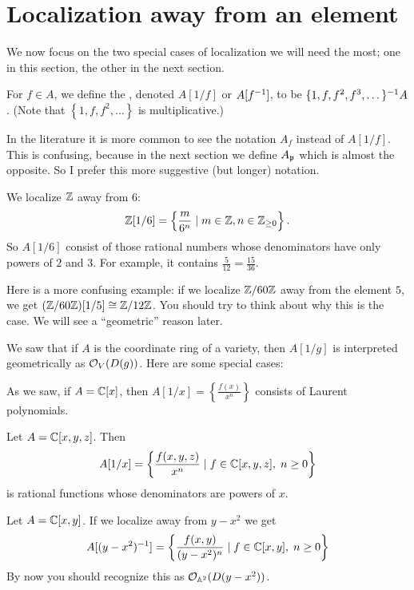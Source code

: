 \section{Localization away from an element}
We now focus on the two special cases of localization we will need the most;
one in this section, the other in the next section.
\begin{definition}
	For $f \in A$, we define the ,
	denoted $A[1/f]$ or $A[f^{-1}]$,
	to be $\{1, f, f^2, f^3, \dots\}^{-1} A$.
	(Note that $\left\{ 1, f, f^2, \dots \right\}$ is multiplicative.)
\end{definition}
\begin{remark}
	In the literature it is more common to
	see the notation $A_f$ instead of $A[1/f]$.
	This is confusing, because in the next section
	we define $A_\mathfrak p$ which is almost the opposite.
	So I prefer this more suggestive (but longer) notation.
\end{remark}

\begin{example}
	\listhack
	\begin{enumerate}[(a)]
		\ii We localize $\mathbb Z$ away from $6$:
		\[ \mathbb Z[1/6] = \left\{ \frac{m}{6^n} \mid m \in \mathbb Z,
			n \in \mathbb Z_{\ge 0} \right\}.  \]
		So $A[1/6]$ consist of those rational numbers whose
		denominators have only powers of $2$ and $3$.
		For example, it contains $\frac{5}{12} = \frac{15}{36}$.

		\ii Here is a more confusing example:
		if we localize $\mathbb Z/60\mathbb Z$ away from the element $5$,
		we get $(\mathbb Z/60\mathbb Z)[1/5] \cong \mathbb Z/12\mathbb Z$.
		You should try to think about why this is the case.
		We will see a ``geometric'' reason later.
	\end{enumerate}
\end{example}


\begin{example}
	We saw that if $A$ is the coordinate ring of a variety,
	then $A[1/g]$ is interpreted geometrically as $\mathcal O_V(D(g))$.
	Here are some special cases:
	\begin{enumerate}[(a)]
		\ii As we saw, if $A = \mathbb C[x]$,
		then $A[1/x] = \left\{ \frac{f(x)}{x^n} \right\}$
		consists of Laurent polynomials.

		\ii Let $A = \mathbb C[x,y,z]$.
		Then \[ A[1/x] = \left\{ \frac{f(x,y,z)}{x^n} \mid
			f \in \mathbb C[x,y,z], \; n \ge 0 \right\} \]
		is rational functions whose denominators are powers of $x$.

		\ii Let $A = \mathbb C[x,y]$.
		If we localize away from $y-x^2$ we get
		\[ A[(y-x^2)^{-1}] = \left\{ \frac{f(x,y)}{(y-x^2)^n} \mid
			f \in \mathbb C[x,y], \; n \ge 0 \right\} \]
		By now you should recognize this as $\mathcal O_{\mathbb A^2}(D(y-x^2))$.
	\end{enumerate}
\end{example}

